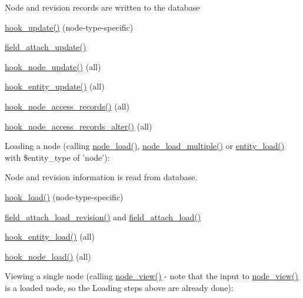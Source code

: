 \begin{DoxyItemize}
\begin{DoxyItemize}
\item Node and revision records are written to the database
\item \hyperlink{group__node__api__hooks_gaf9c98e3839e9405df42b50c8cdfa9dca}{hook\_\-update()} (node-\/type-\/specific)
\item \hyperlink{group__field__attach_ga8d15efdca36306ea04552bed4986e77b}{field\_\-attach\_\-update()}
\item \hyperlink{group__node__api__hooks_gac66c767cc922fcbfdaf17252e5d87d9d}{hook\_\-node\_\-update()} (all)
\item \hyperlink{group__hooks_ga4b7c83c8b2e4f3719327ae794d0964ef}{hook\_\-entity\_\-update()} (all)
\item \hyperlink{group__node__access_ga3fe7744d74446e40e9b9ad2a782b4269}{hook\_\-node\_\-access\_\-records()} (all)
\item \hyperlink{group__node__access_ga37c90bf0e1dccad0deefa368dd94cc83}{hook\_\-node\_\-access\_\-records\_\-alter()} (all)
\end{DoxyItemize}
\item Loading a node (calling \hyperlink{node_8module_a492ddfc12843e71242bb484a44e51a19}{node\_\-load()}, \hyperlink{node_8module_a12f29f65250380f9e592d8d5497313e3}{node\_\-load\_\-multiple()} or \hyperlink{common_8inc_a78b89cf93f9710a68d02f86adccf1898}{entity\_\-load()} with \$entity\_\-type of 'node'):
\begin{DoxyItemize}
\item Node and revision information is read from database.
\item \hyperlink{group__node__api__hooks_ga49065b040d7fb3e02889eda6361dac34}{hook\_\-load()} (node-\/type-\/specific)
\item \hyperlink{group__field__attach_gac79dd0f29910835c653b068233fa429b}{field\_\-attach\_\-load\_\-revision()} and \hyperlink{group__field__attach_ga1e92543395961c912eb293b50e991586}{field\_\-attach\_\-load()}
\item \hyperlink{group__hooks_ga1f594647c8cbb27f75b77cc4118da8d6}{hook\_\-entity\_\-load()} (all)
\item \hyperlink{group__node__api__hooks_gad48bb14b68ed38526029d1f7ac2d2de4}{hook\_\-node\_\-load()} (all)
\end{DoxyItemize}
\item Viewing a single node (calling \hyperlink{node_8module_ac2c64fdfacc25be79a6ecf406ab62320}{node\_\-view()} -\/ note that the input to \hyperlink{node_8module_ac2c64fdfacc25be79a6ecf406ab62320}{node\_\-view()} is a loaded node, so the Loading steps above are already done):

\end{DoxyItemize}

